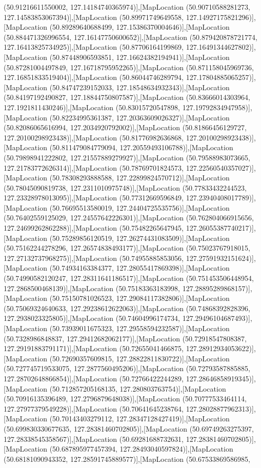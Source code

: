 (50.91216611550002, 127.14184740365974)],[MapLocation (50.90710588281273, 127.14583853067394)],[MapLocation (50.89971749649558, 127.14927175821296)],[MapLocation (50.89289640688499, 127.15386370004646)],[MapLocation (50.884471326996554, 127.16147750600652)],[MapLocation (50.879420878721774, 127.16413825734925)],[MapLocation (50.87706164199869, 127.16491344627802)],[MapLocation (50.87448906593851, 127.16624382194941)],[MapLocation (50.87281004497849, 127.16718795952265)],[MapLocation (50.871158045969736, 127.16851833519404)],[MapLocation (50.86044746289794, 127.17804885065257)],[MapLocation (50.84747239152033, 127.18548634932343)],[MapLocation (50.84197192490827, 127.18844750807587)],[MapLocation (50.83666014303964, 127.1921811430246)],[MapLocation (50.83015720547898, 127.19792834947958)],[MapLocation (50.82234995361387, 127.20363609026327)],[MapLocation (50.82086065616994, 127.2034920792002)],[MapLocation (50.81866456129727, 127.20100298923438)],[MapLocation (50.81776982636868, 127.20100298923438)],[MapLocation (50.811479084779094, 127.20559493106788)],[MapLocation (50.79898941222802, 127.21557889279927)],[MapLocation (50.79588983073665, 127.21783772626314)],[MapLocation (50.78769701824573, 127.22560540357027)],[MapLocation (50.78308293888588, 127.22899824570712)],[MapLocation (50.78045090819738, 127.2311010975748)],[MapLocation (50.77833432244523, 127.23328978013095)],[MapLocation (50.77312669596849, 127.23940408017789)],[MapLocation (50.76695513580019, 127.24404725535756)],[MapLocation (50.76402559125029, 127.24557642226301)],[MapLocation (50.762804066915656, 127.24699262862288)],[MapLocation (50.75482265647945, 127.26055387740217)],[MapLocation (50.75289856120519, 127.26274431083509)],[MapLocation (50.75162244278296, 127.26574838493177)],[MapLocation (50.75023767918015, 127.27132737968275)],[MapLocation (50.74955885853056, 127.27591932151624)],[MapLocation (50.74934163384377, 127.28055417869398)],[MapLocation (50.74990582120247, 127.28311641186517)],[MapLocation (50.751453506448954, 127.2868500468139)],[MapLocation (50.75183363183998, 127.28895289868157)],[MapLocation (50.75150781026523, 127.29084117382806)],[MapLocation (50.75069324640633, 127.29238612622063)],[MapLocation (50.74868392828396, 127.2938023325805)],[MapLocation (50.74604996174734, 127.29496104687493)],[MapLocation (50.73939011675323, 127.29558594232587)],[MapLocation (50.7328986848837, 127.29412682062177)],[MapLocation (50.72918547808387, 127.29191883791171)],[MapLocation (50.72655041466875, 127.28912934053622)],[MapLocation (50.72690357609815, 127.28822811830722)],[MapLocation (50.727745719533075, 127.2877560495206)],[MapLocation (50.72793587885885, 127.28702648866854)],[MapLocation (50.72766422244289, 127.28646858919345)],[MapLocation (50.712857205168135, 127.280803763754)],[MapLocation (50.70916135396489, 127.2796879648038)],[MapLocation (50.70777533464114, 127.27977379549228)],[MapLocation (50.70641645238764, 127.28028877962313)],[MapLocation (50.70143403279112, 127.28347128427419)],[MapLocation (50.699830330677635, 127.28381460702805)],[MapLocation (50.69749263275397, 127.28338545358567)],[MapLocation (50.69281688732631, 127.28381460702805)],[MapLocation (50.687895977457394, 127.28493040597824)],[MapLocation (50.68181090943352, 127.28591745889577)],[MapLocation (50.67533869586985, 